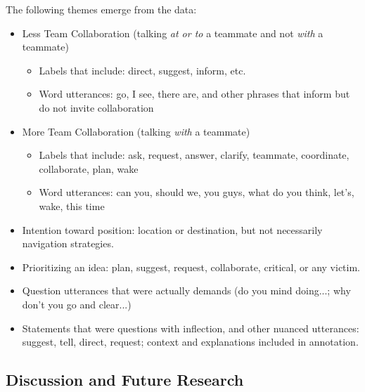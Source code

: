 The following themes emerge from the data:
\begin{itemize}
    \item Less Team Collaboration (talking \emph{at or to} a teammate and not \emph{with} a teammate)
    \begin{itemize}
    	\item Labels that include: direct, suggest, inform, etc.
	\item Word utterances: go, I see, there are, and other phrases that inform but do not invite collaboration
    \end{itemize}
    \item More Team Collaboration (talking \emph{with} a teammate)
    \begin{itemize}
        \item Labels that include: ask, request, answer, clarify, teammate, coordinate, collaborate, plan, wake
        \item Word utterances: can you, should we, you guys, what do you think, let's, wake, this time
    \end{itemize}
    \item Intention toward position: location or destination, but not necessarily navigation strategies.
    \item Prioritizing an idea: plan, suggest, request, collaborate, critical, or any victim.
    \item Question utterances that were actually demands (do you mind doing...; why don't you go and clear...)
    \item Statements that were questions with inflection, and other nuanced utterances: suggest, tell, direct, request; context and explanations included in annotation.
\end{itemize}


\subsection{Discussion and Future Research}

